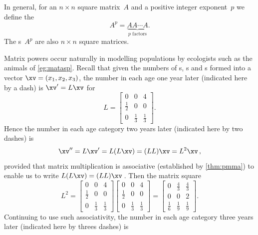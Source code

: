 In general, for an \(n\times n\) square matrix~\(A\) and a positive integer exponent~\(p\) we define the 
\begin{equation*}
A^p=\underbrace{AA\cdots A}_{p\text{ factors}}.
\end{equation*}
The s~\(A^p\) are also \(n\times n\) square matrices.


\begin{example} \label{eg:poppred}
Matrix powers occur naturally in modelling populations by ecologists such as the animals of \cref{eg:matasp}.
Recall that given the numbers of  s, s and s formed into a vector \(\xv=(x_1,x_2,x_3)\), the number in each age one year later (indicated here by a dash) is \(\xv'=L\xv\) for 
\begin{equation*}
L=\begin{bmatrix} 0&0&4\\\frac12&0&0\\0&\frac13&\frac13 \end{bmatrix}.
\end{equation*}
Hence the number in each age category two years later (indicated here by two dashes) is
\begin{equation*}
\xv''=L\xv'=L(L\xv)=(LL)\xv=L^2\xv\,,
\end{equation*}
provided that matrix multiplication is associative (established by \cref{thm:pmma}) to enable us to write \(L(L\xv)=(LL)\xv\)\,.
Then the matrix square
\begin{equation*}
L^2=\begin{bmatrix} 0&0&4\\\frac12&0&0\\0&\frac13&\frac13 \end{bmatrix}\begin{bmatrix} 0&0&4\\\frac12&0&0\\0&\frac13&\frac13 \end{bmatrix}
=\begin{bmatrix} 0&\frac43&\frac43\\0&0&2\\\frac16&\frac19&\frac19 \end{bmatrix}.
\end{equation*}
Continuing to use such associativity, 
the number in each age category three years later (indicated here by threes dashes) is
\begin{equation*}

\end{equation*}
\end{example}
